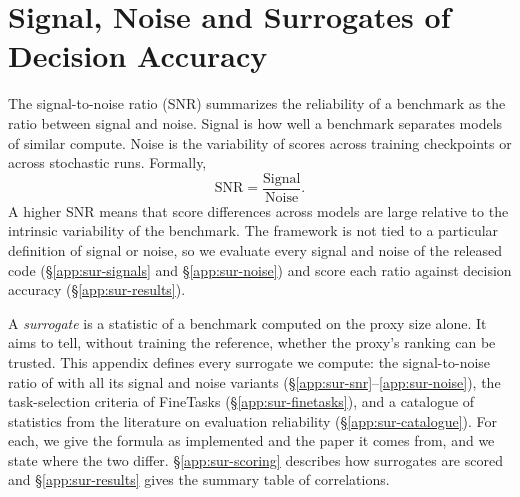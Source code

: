 
\clearpage

\section{Signal, Noise and Surrogates of Decision Accuracy}
\label{subsec:methodology-snr}
\label{app:surrogates}

The signal-to-noise ratio (SNR) summarizes the reliability of a benchmark as the ratio between signal and noise. Signal is how well a benchmark separates models of similar compute. Noise is the variability of scores across training checkpoints or across stochastic runs.
Formally,
\begin{equation}
\text{SNR} = \frac{\text{Signal}}{\text{Noise}}.
\end{equation}
A higher SNR means that score differences across models are large relative to the intrinsic variability of the benchmark. The framework is not tied to a particular definition of signal or noise, so we evaluate every signal and noise of the released code (\S\ref{app:sur-signals} and \S\ref{app:sur-noise}) and score each ratio against decision accuracy (\S\ref{app:sur-results}).

A \emph{surrogate} is a statistic of a benchmark computed on the proxy size alone. It aims to tell, without training the reference, whether the proxy's ranking can be trusted.
This appendix defines every surrogate we compute: the signal-to-noise ratio of \citet{heineman_signal_2025} with all its signal and noise variants (\S\ref{app:sur-snr}--\ref{app:sur-noise}), the task-selection criteria of FineTasks (\S\ref{app:sur-finetasks}), and a catalogue of statistics from the literature on evaluation reliability (\S\ref{app:sur-catalogue}).
For each, we give the formula as implemented and the paper it comes from, and we state where the two differ.
\S\ref{app:sur-scoring} describes how surrogates are scored and \S\ref{app:sur-results} gives the summary table of correlations.

